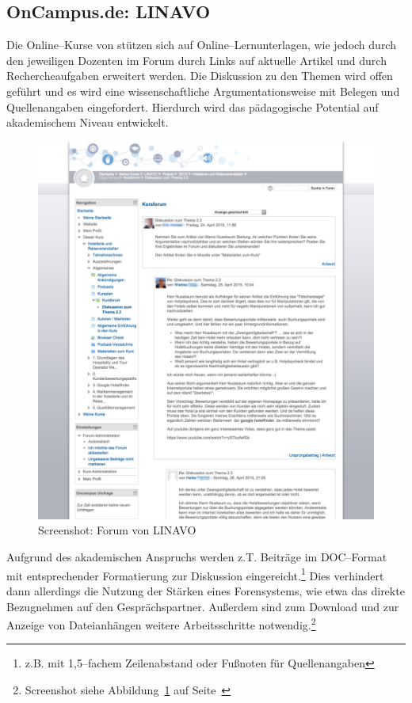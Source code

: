 
\subsection{OnCampus.de: LINAVO} %
\label{sub:oncampus_de}

Die Online–Kurse von  stützen sich auf Online–Lernunterlagen, wie jedoch durch den jeweiligen Dozenten im Forum durch Links auf aktuelle Artikel und durch Rechercheaufgaben erweitert werden. Die Diskussion zu den Themen wird offen geführt und es wird eine wissenschaftliche Argumentationsweise mit Belegen und Quellenangaben eingefordert. Hierdurch wird das pädagogische Potential auf akademischem Niveau entwickelt.

\begin{figure}[p]
\begin{center}
\includegraphics[width=\textwidth]{linavo.jpg}
\caption{Screenshot: Forum von LINAVO}
\label{fig:linavo}
\end{center}
\end{figure}

Aufgrund des akademischen Anspruchs werden z.T. Beiträge im DOC–Format mit entsprechender Formatierung zur Diskussion eingereicht.\footnote{z.B. mit 1,5–fachem Zeilenabstand oder Fußnoten für Quellenangaben} Dies verhindert dann allerdings die Nutzung der Stärken eines Forensystems, wie etwa das direkte Bezugnehmen auf den Gesprächspartner. Außerdem sind zum Download und zur Anzeige von Dateianhängen weitere Arbeitsschritte notwendig.\footnote{Screenshot siehe Abbildung~\ref{fig:linavo} auf Seite~\pageref{fig:linavo}}

